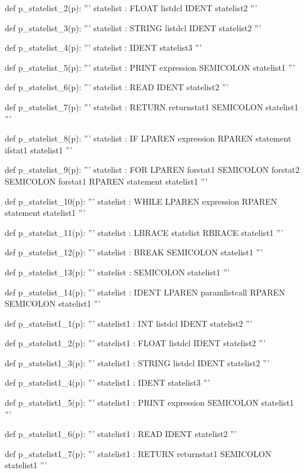 \documentclass[
	12pt,				%
	openright,			%
	twoside,			%
	a4paper,			%
	english,			%
	french,				%
	spanish,			%
	brazil				%
	]{abntex2}
\begin{document}
\begin{python}
def p_statelist_2(p):
    '''
    statelist : FLOAT listdcl IDENT statelist2
    '''

def p_statelist_3(p):
    '''
    statelist : STRING listdcl IDENT statelist2
    '''

def p_statelist_4(p):
    '''
    statelist : IDENT statelist3
    '''

def p_statelist_5(p):
    '''
    statelist : PRINT expression SEMICOLON statelist1
    '''

def p_statelist_6(p):
    '''
    statelist : READ IDENT statelist2
    '''

def p_statelist_7(p):
    '''
    statelist : RETURN returnstat1 SEMICOLON statelist1
    '''

def p_statelist_8(p):
    '''
    statelist : IF LPAREN expression RPAREN statement ifstat1 statelist1
    '''

def p_statelist_9(p):
    '''
    statelist : FOR LPAREN forstat1 SEMICOLON forstat2 SEMICOLON forstat1 RPAREN statement statelist1
    '''

def p_statelist_10(p):
    '''
    statelist : WHILE LPAREN expression RPAREN statement statelist1
    '''

def p_statelist_11(p):
    '''
    statelist : LBRACE statelist RBRACE statelist1
    '''

def p_statelist_12(p):
    '''
    statelist : BREAK SEMICOLON statelist1
    '''

def p_statelist_13(p):
    '''
    statelist : SEMICOLON statelist1
    '''

def p_statelist_14(p):
    '''
    statelist : IDENT LPAREN paramlistcall RPAREN SEMICOLON statelist1
    '''

def p_statelist1_1(p):
    '''
    statelist1 : INT listdcl IDENT statelist2
    '''

def p_statelist1_2(p):
    '''
    statelist1 : FLOAT listdcl IDENT statelist2
    '''

def p_statelist1_3(p):
    '''
    statelist1 : STRING listdcl IDENT statelist2
    '''

def p_statelist1_4(p):
    '''
    statelist1 : IDENT statelist3
    '''

def p_statelist1_5(p):
    '''
    statelist1 : PRINT expression SEMICOLON statelist1
    '''

def p_statelist1_6(p):
    '''
    statelist1 : READ IDENT statelist2
    '''

def p_statelist1_7(p):
    '''
    statelist1 : RETURN returnstat1 SEMICOLON statelist1
    '''


\end{python}
\end{document}

